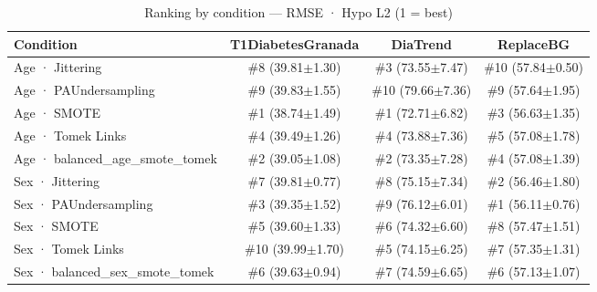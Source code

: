 \begin{table}[htbp]
\centering
\small
\caption{Ranking by condition — RMSE · Hypo L2  (1 = best)}
\label{tab:ranking_rmse_tbr_2_family_mechanism_guided}
\begin{tabular}{lccc}
\toprule
\textbf{Condition} & \textbf{T1DiabetesGranada} & \textbf{DiaTrend} & \textbf{ReplaceBG} \\
\midrule
Age · Jittering & \#8 (39.81$\pm$1.30) & \#3 (73.55$\pm$7.47) & \#10 (57.84$\pm$0.50) \\
Age · PAUndersampling & \#9 (39.83$\pm$1.55) & \#10 (79.66$\pm$7.36) & \#9 (57.64$\pm$1.95) \\
Age · SMOTE & \#1 (38.74$\pm$1.49) & \#1 (72.71$\pm$6.82) & \#3 (56.63$\pm$1.35) \\
Age · Tomek Links & \#4 (39.49$\pm$1.26) & \#4 (73.88$\pm$7.36) & \#5 (57.08$\pm$1.78) \\
Age · balanced_age_smote_tomek & \#2 (39.05$\pm$1.08) & \#2 (73.35$\pm$7.28) & \#4 (57.08$\pm$1.39) \\
\midrule
Sex · Jittering & \#7 (39.81$\pm$0.77) & \#8 (75.15$\pm$7.34) & \#2 (56.46$\pm$1.80) \\
Sex · PAUndersampling & \#3 (39.35$\pm$1.52) & \#9 (76.12$\pm$6.01) & \#1 (56.11$\pm$0.76) \\
Sex · SMOTE & \#5 (39.60$\pm$1.33) & \#6 (74.32$\pm$6.60) & \#8 (57.47$\pm$1.51) \\
Sex · Tomek Links & \#10 (39.99$\pm$1.70) & \#5 (74.15$\pm$6.25) & \#7 (57.35$\pm$1.31) \\
Sex · balanced_sex_smote_tomek & \#6 (39.63$\pm$0.94) & \#7 (74.59$\pm$6.65) & \#6 (57.13$\pm$1.07) \\
\bottomrule
\end{tabular}
\end{table}